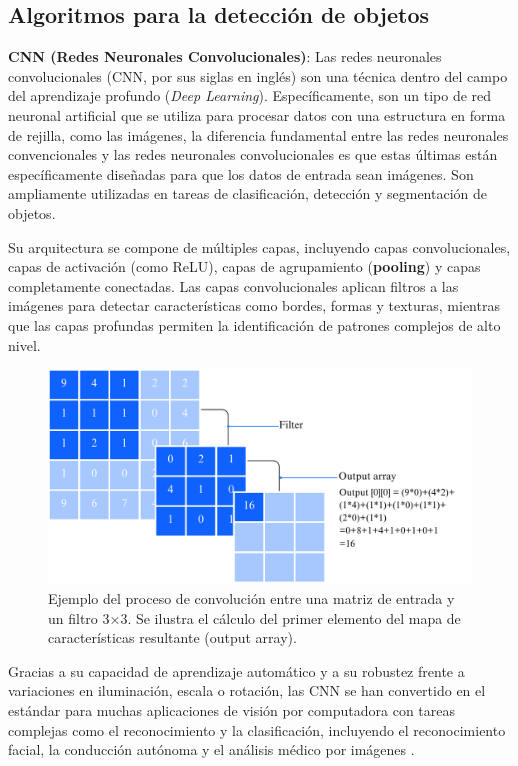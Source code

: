 \subsection*{Algoritmos para la detección de objetos} 

\textbf{CNN (Redes Neuronales Convolucionales)}: Las redes neuronales convolucionales (CNN, por sus siglas en inglés) son una técnica dentro del campo del aprendizaje profundo (\textit{Deep Learning}). Específicamente, son un tipo de red neuronal artificial que se utiliza para procesar datos con una estructura en forma de rejilla, como las imágenes, la diferencia fundamental entre las redes neuronales convencionales y las redes neuronales convolucionales es que estas últimas están específicamente diseñadas para que los datos de entrada sean imágenes. Son ampliamente utilizadas en tareas de clasificación, detección y segmentación de objetos\cite{centeno2019deep}\cite{sanchez2020evaluacion}\cite{iaavanzada}.

Su arquitectura se compone de múltiples capas, incluyendo capas convolucionales, capas de activación (como ReLU), capas de agrupamiento (\textbf{pooling}) y capas completamente conectadas. Las capas convolucionales aplican filtros a las imágenes para detectar características como bordes, formas y texturas, mientras que las capas profundas permiten la identificación de patrones complejos de alto nivel.
    
    \begin{figure}[H]
        \centering
        \includegraphics[width=0.8\linewidth]{Documento/Imagenes/Marco Teorico/CNN.pdf}
        \caption{Ejemplo del proceso de convolución entre una matriz de entrada y un filtro 3×3. Se ilustra el cálculo del primer elemento del mapa de características resultante (output array).}
        \label{fig:cnnIBM}
    \end{figure}
    
    Gracias a su capacidad de aprendizaje automático y a su robustez frente a variaciones en iluminación, escala o rotación, las CNN se han convertido en el estándar para muchas aplicaciones de visión por computadora con tareas complejas como el reconocimiento y la clasificación, incluyendo el reconocimiento facial, la conducción autónoma y el análisis médico por imágenes \cite{cnnIBM}.

